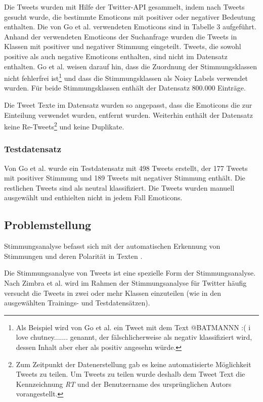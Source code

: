 \documentclass[researchlab,group,]{AIGpaper}
\begin{document}
Die Tweets wurden mit Hilfe der Twitter-API gesammelt, indem nach Tweets gesucht wurde, die bestimmte Emoticons mit positiver oder negativer Bedeutung enthalten.
Die von Go et al. verwendeten Emoticons sind in Tabelle 3 \cite[S. 4]{go2009twitter} aufgeführt.
Anhand der verwendeten Emoticons der Suchanfrage wurden die Tweets in Klassen mit positiver und negativer Stimmung eingeteilt.
Tweets, die sowohl positive als auch negative Emoticons enthalten, sind nicht im Datensatz enthalten.
Go et al. \cite{go2009twitter} weisen darauf hin, dass die Zuordnung der Stimmungsklassen nicht fehlerfrei ist\footnote{
    Als Beispiel wird von Go et al. \cite{go2009twitter} ein Tweet mit dem Text \glqq @BATMANNN :( i love chutney.......\grqq{} genannt, der fälschlicherweise als negativ klassifiziert wird, dessen Inhalt aber eher als positiv angesehn würde.
} und dass die Stimmungsklassen als Noisy Labels verwendet wurden.
Für beide Stimmungsklassen enthält der Datensatz 800.000 Einträge.

Die Tweet Texte im Datensatz wurden so angepasst, dass die Emoticons die zur Einteilung verwendet wurden, entfernt wurden.
Weiterhin enthält der Datensatz keine Re-Tweets\footnote{
    Zum Zeitpunkt der Datenerstellung gab es keine automatisierte Möglichkeit Tweets zu teilen.
    Um Tweets zu teilen wurde deshalb dem Tweet Text die Kennzeichnung \textit{RT} und der Benutzername des ursprünglichen Autors vorangestellt.
} und keine Duplikate.

\subsubsection{Testdatensatz}

Von Go et al. \cite{go2009twitter} wurde ein Testdatensatz mit 498 Tweets erstellt, der 177 Tweets mit positiver Stimmung und 189 Tweets mit negativer Stimmung enthält.
Die restlichen Tweets sind als neutral klassifiziert.
Die Tweets wurden manuell ausgewählt und enthielten nicht in jedem Fall Emoticons.

\subsection{Problemstellung}

Stimmungsanalyse befasst sich mit der automatischen Erkennung von Stimmungen und deren Polarität in Texten \cite{giachanou2016like, jianqiang2017comparison, zimbra2018state}.

Die Stimmungsanalyse von Tweets ist eine spezielle Form der Stimmungsanalyse.
Nach Zimbra et al. \cite{zimbra2018state} wird im Rahmen der Stimmungsanalyse für Twitter häufig versucht die Tweets in zwei oder mehr Klassen einzuteilen (wie in den ausgewählten Trainings- und Testdatensätzen).
\end{document}

